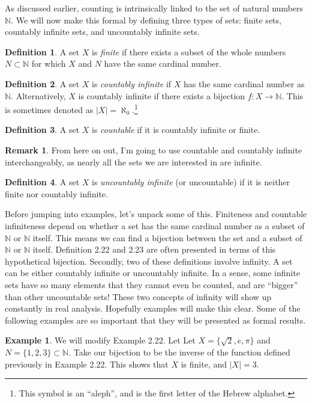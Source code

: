 \documentclass{article}
\newcommand{\N}{\mathbb{N}}
\theoremstyle{definition}
\newtheorem{definition}{Definition}[section]
\newtheorem{example}{Example}[section]
\newtheorem{remark}{Remark}[section]
\begin{document}
As discussed earlier, counting is intrinsically linked to the set of natural numbers $ \N $. We will now make this formal by defining three types of sets: finite sets, countably infinite sets, and uncountably infinite sets.
\begin{definition}
	A set $ X $ is \textit{\color{red}finite} if there exists a subset of the whole numbers $ N\subset \N $ for which $ X $ and $ N $ have the same cardinal number.
\end{definition} 
\begin{definition}
	A set $ X $ is \textit{\color{red}countably infinite} if $ X $ has the same cardinal number as $ \N $. Alternatively, $ X $ is countably infinite if there exists a bijection $ f:X\to\N $. This is sometimes denoted as $ |X|=\aleph_0 $.\footnote{This symbol is an ``aleph'', and is the first letter of the Hebrew alphabet.} 
\end{definition}
\begin{definition}
	A set $ X $ is \textit{\color{red}countable} if it is countably infinite or finite.
\end{definition}
\begin{remark}
	From here on out, I'm going to use countable and countably infinite interchangeably, as nearly all the sets we are interested in are infinite.  
\end{remark}
\begin{definition}
	A set $ X $ is  \textit{\color{red}uncountably infinite} (or uncountable) if it is neither finite nor countably infinite.
\end{definition}
Before jumping into examples, let's unpack some of this. Finiteness and countable infiniteness depend on whether a set has the same cardinal number as a subset of $ \N $ or $ \N $ itself. This means we can find a bijection between the set and a subset of $ \N $ or $ \N $ itself. Definition 2.22 and 2.23 are often presented in terms of this hypothetical bijection. Secondly, two of these definitions involve infinity. A set can be either countably infinite or uncountably infinite. In a sense, some infinite sets have so many elements that they cannot even be counted, and are ``bigger'' than other uncountable sets! These two concepts of infinity will show up constantly in real analysis. Hopefully examples will make this clear. Some of the following examples are so important that they will be presented as formal results. 
\begin{example}
 We will modify Example 2.22. Let Let $ X=\{\sqrt{2},e,\pi\} $ and $ N=\{1,2,3\}\subset \N$. Take our bijection to be the inverse of the function defined previously in Example 2.22. This shows that $ X $ is finite, and $ |X|=3 $. 
\end{example}
\end{document}
